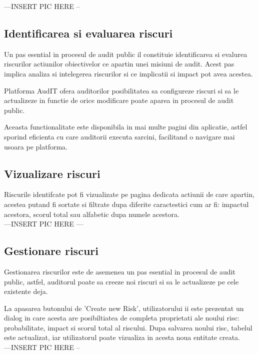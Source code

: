 ---INSERT PIC HERE -- \\



\subsection*{Identificarea si evaluarea riscuri}

Un pas esential in procesul de audit public il constituie identificarea si evalurea riscurilor actiunilor obiectivelor ce apartin unei misiuni de audit. Acest pas implica analiza si intelegerea riscurilor si ce implicatii si impact pot avea acestea.

 Platforma AudIT ofera auditorilor posibilitatea sa configureze riscuri si sa le actualizeze in functie de orice modificare poate aparea in procesul de audit public.
 
 Aceasta functionalitate este disponibila in mai multe pagini din aplicatie, astfel sporind eficienta cu care auditorii executa sarcini, facilitand o navigare mai usoara pe platforma.
 
 \subsection*{Vizualizare riscuri}
 Riscurile identifcate pot fi vizualizate pe pagina dedicata actiunii de care apartin, acestea putand fi sortate si filtrate dupa diferite caractestici cum ar fi: impactul acestora, scorul total sau alfabetic dupa numele acestora. \\
 
 ---INSERT PIC HERE --- \\
 
 \subsection*{Gestionare riscuri}
Gestionarea riscurilor este de asemenea un pas esential in procesul de audit public, astfel, auditorul poate sa creeze noi riscuri si sa le actualizeze pe cele existente deja.

La apasarea butonului de 'Create new Risk', utilizatorului ii este prezentat un dialog in care acesta are posibiltiatea de completa proprietati ale noului risc: probabilitate, impact si scorul total al riscului. Dupa salvarea noului risc, tabelul este actualizat, iar utilizatorul poate vizualiza in acesta noua entitate creata.\\

---INSERT PIC HERE --\\

